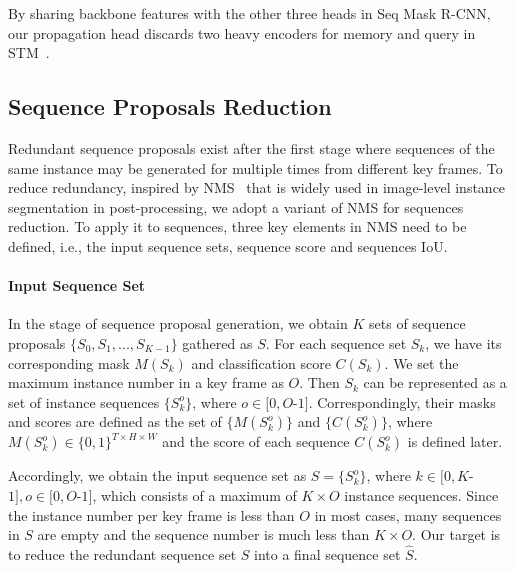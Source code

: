 \documentclass[10pt,twocolumn,letterpaper]{article}
\begin{document}
	By sharing backbone features with the other three heads in Seq Mask R-CNN, our propagation head discards two heavy encoders for memory and query in STM~\cite{oh2019video}. 
	
	
	\subsection{Sequence Proposals Reduction}\label{Sec:SPR}
	Redundant sequence proposals exist after the first stage where sequences of the same instance may be generated for multiple times from different key frames. To reduce redundancy, inspired by NMS~\cite{girshick2014rich,girshick2015fast,ren2015faster,rothe2014non} that is widely used in image-level instance segmentation in post-processing, we adopt a variant of NMS for sequences reduction. To apply it to sequences, three key elements in NMS need to be defined, i.e., the input sequence sets, sequence score and sequences IoU.
	
	\vspace{-0.1in}
	\paragraph{Input Sequence Set}
	In the stage of sequence proposal generation, we obtain $K$ sets of sequence proposals $\{S_0, S_1, ..., S_{K-1}\}$ gathered as $S$. For each sequence set $S_k$, we have its corresponding mask $M(S_k)$ and classification score $C(S_k)$. 
	We set the maximum instance number in a key frame as $O$. Then $S_k$ can be represented as a set of instance sequences $\{S_k^o\}$, where $o \in [0, O$-$1]$. Correspondingly, their masks and scores are defined as the set of $\{M(S_k^o)\}$ and $\{C(S_k^o)\}$,
where $M(S_k^o) \in \{0,1\}^{T\times H\times W}$ and the score of each sequence $C(S_k^o)$ is defined later.
	
	Accordingly, we obtain the input sequence set as $S=\{S_k^o\}$, where $k \in [0, K$-$1], o \in [0, O$-$1]$, which consists of a maximum of $K \times O$ instance sequences. Since the instance number per key frame is less than $O$ in most cases, many sequences in $S$ are empty and the sequence number is much less than $K \times O$. 
	Our target is to reduce the redundant sequence set $S$ into a final sequence set $\widehat{S}$.
	
	\vspace{-0.1in}
\end{document}
